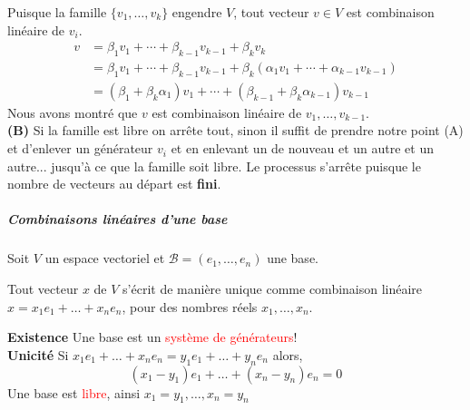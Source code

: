 Puisque la famille $\{v_1, \dots, v_k\}$ engendre $V$, tout vecteur $v \in V$ est combinaison linéaire de $v_i$.
\begin{align*}
v &= \beta_1 v_1 + \cdots + \beta_{k-1} v_{k-1} + \beta_k v_k \\
  &= \beta_1 v_1 + \cdots + \beta_{k-1} v_{k-1} + \beta_k (\alpha_1 v_1 + \cdots + \alpha_{k-1} v_{k-1}) \\
  &= (\beta_1 + \beta_k \alpha_1) v_1 + \cdots + (\beta_{k-1} + \beta_k \alpha_{k-1}) v_{k-1}
\end{align*}
Nous avons montré que $v$ est combinaison linéaire de $v_1, \dots, v_{k-1}$.
\\
\textbf{(B)} Si la famille est libre on arrête tout, sinon il suffit de prendre notre point (A) et d'enlever un générateur $v_i$ et en enlevant un de nouveau et un autre et un autre... jusqu'à ce que la famille soit libre. Le processus s'arrête puisque le nombre de vecteurs au départ est \textbf{fini}.









\subparagraph{Combinaisons linéaires d'une base}
Soit $V$ un espace vectoriel et $\mathcal{B} = (e_1, \dots, e_n)$ une base.
\begin{theoreme}
    Tout vecteur $x$ de $V$ s'écrit de manière unique comme combinaison linéaire $x = x_1e_1 + \dots + x_ne_n$, pour des nombres réels $x_1, \dots, x_n$.
\end{theoreme}
\textbf{Existence} Une base est un \textcolor{red}{système de générateurs}!
\\
\textbf{Unicité} Si $x_1e_1 + \dots + x_ne_n = y_1e_1 + \dots + y_ne_n$ alors, 
\[(x_1 - y_1)e_1 + \dots +(x_n - y_n)e_n = 0\]
Une base est \textcolor{red}{libre}, ainsi $x_1 = y_1, \dots, x_n = y_n$
